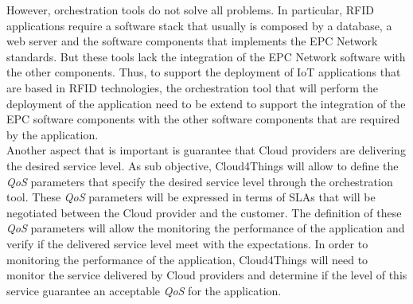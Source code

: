 However, orchestration tools do not solve all problems. In particular, RFID applications require a
software stack that usually is composed by a database, a web server and the software components
that implements the EPC Network standards. But these tools lack the integration of the EPC
Network software with the other components. Thus, to support the deployment of IoT applications
that are based in RFID technologies, the orchestration tool that will perform the deployment
of the application need to be extend to support the integration of the EPC software components
with the other software components that are required by the application.\\

Another aspect that is important is guarantee that Cloud providers are delivering
the desired service level. As sub objective, Cloud4Things will allow to define the
\textit{QoS} parameters that specify the desired service level through the orchestration
tool. These \textit{QoS} parameters will be expressed in terms of SLAs that will be
negotiated between the Cloud provider and the customer. The definition of these \textit{QoS}
parameters will allow the monitoring the performance of the application and verify if the
delivered service level meet with the expectations. In order to monitoring the performance
of the application, Cloud4Things will need to monitor the service delivered by Cloud
providers and determine if the level of this service guarantee an
acceptable \textit{QoS} for the application.
